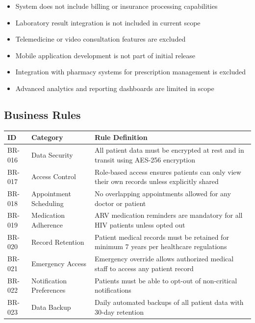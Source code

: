 \documentclass[12pt,a4paper]{article}
\begin{document}
\begin{itemize}
    \item System does not include billing or insurance processing capabilities
    \item Laboratory result integration is not included in current scope
    \item Telemedicine or video consultation features are excluded
    \item Mobile application development is not part of initial release
    \item Integration with pharmacy systems for prescription management is excluded
    \item Advanced analytics and reporting dashboards are limited in scope
\end{itemize}

\subsection{Business Rules}

\begin{longtable}{|p{2cm}|p{3cm}|p{9cm}|}
\hline
\textbf{ID} & \textbf{Category} & \textbf{Rule Definition} \\
\hline
BR-016 & Data Security & All patient data must be encrypted at rest and in transit using AES-256 encryption \\
\hline
BR-017 & Access Control & Role-based access ensures patients can only view their own records unless explicitly shared \\
\hline
BR-018 & Appointment Scheduling & No overlapping appointments allowed for any doctor or patient \\
\hline
BR-019 & Medication Adherence & ARV medication reminders are mandatory for all HIV patients unless opted out \\
\hline
BR-020 & Record Retention & Patient medical records must be retained for minimum 7 years per healthcare regulations \\
\hline
BR-021 & Emergency Access & Emergency override allows authorized medical staff to access any patient record \\
\hline
BR-022 & Notification Preferences & Patients must be able to opt-out of non-critical notifications \\
\hline
BR-023 & Data Backup & Daily automated backups of all patient data with 30-day retention \\
\hline
\end{longtable}
\end{document}
